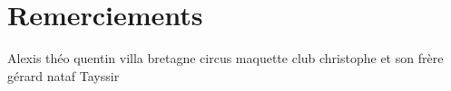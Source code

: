 \chapter*{Remerciements}

Alexis théo quentin villa bretagne circus maquette club christophe et son frère gérard nataf Tayssir 

